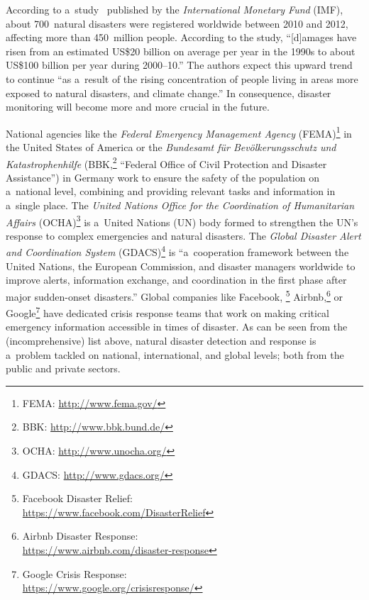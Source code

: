 \documentclass[letterpaper]{article}
\begin{document}
According to a~study~\cite{laframboise2012naturaldisasters}
published by the \emph{International Monetary Fund} (IMF),
about 700~natural disasters were registered worldwide between 2010 and 2012,
affecting more than 450~million people.
According to the study, ``[d]amages have risen
from an estimated US\$20 billion on average per year
in the 1990s to about US\$100 billion per year during 2000--10.''
The authors expect this upward trend to continue
``as a~result of the rising concentration of people
living in areas more exposed to natural disasters,
and climate change.''
In consequence, disaster monitoring will
become more and more crucial in the future.

National agencies like the
\emph{Federal Emergency Management Agency}
(FEMA)\footnote{FEMA: \url{http://www.fema.gov/}}
in the United States of America or the
\emph{Bundesamt für Bevölkerungsschutz und Katastrophenhilfe}
(BBK,\footnote{BBK: \url{http://www.bbk.bund.de/}}
``Federal Office of Civil Protection and Disaster Assistance'')
in Germany work to ensure the safety of the population
on a~national level, combining and providing relevant tasks
and information in a~single place.
The \emph{United Nations Office for the Coordination of Humanitarian Affairs}
(OCHA)\footnote{OCHA: \url{http://www.unocha.org/}}
is a~United Nations (UN) body formed to strengthen the UN's response
to complex emergencies and natural disasters.
The \emph{Global Disaster Alert and Coordination System}
(GDACS)\footnote{GDACS: \url{http://www.gdacs.org/}}
is ``a~cooperation framework between the United Nations,
the European Commission, and disaster managers worldwide
to improve alerts, information exchange, and coordination
in the first phase after major sudden-onset disasters.''
Global companies like Facebook,%
\footnote{Facebook Disaster Relief:\\\null\hspace{2em}
\url{https://www.facebook.com/DisasterRelief}}
Airbnb,\footnote{Airbnb Disaster Response:\\\null\hspace{2em}
\url{https://www.airbnb.com/disaster-response}} or
Google\footnote{Google Crisis Response:\\\null\hspace{2em}
\url{https://www.google.org/crisisresponse/}}
have dedicated crisis response teams that work on
making critical emergency information accessible in times of disaster.
As can be seen from the (incomprehensive) list above,
natural disaster detection and response is a~problem
tackled on national, international, and global levels;
both from the public and private sectors.
\end{document}
